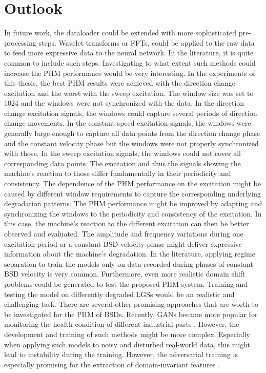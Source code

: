 \chapter{Outlook}
In future work, the dataloader could be extended with more sophisticated pre-processing steps. Wavelet transforms or FFTs, could be applied to the raw data to feed more expressive data to the neural network. In the literature, it is quite common to include such steps. Investigating to what extent such methods could increase the PHM performance would be very interesting.
In the experiments of this thesis, the best PHM results were achieved with the direction change excitation and the worst with the sweep excitation. The window size was set to 1024 and the windows were not synchronized with the data. In the direction change excitation signals, the windows could capture several periods of direction change movements. In the constant speed excitation signals, the windows were generally large enough to capture all data points from the direction change phase and the constant velocity phase but the windows were not properly synchronized with those. In the sweep excitation signals, the windows could not cover all corresponding data points. The excitation and thus the signals showing the machine's reaction to those differ fundamentally in their periodicity and consistency. The dependence of the PHM performance on the excitation might be caused by different window requirements to capture the corresponding underlying degradation patterns. The PHM performance might be improved by adapting and synchronizing the windows to the periodicity and consistency of the excitation. In this case, the machine's reaction to the different excitation can then be better observed and evaluated. The amplitude and frequency variations during one excitation period or a constant BSD velocity phase might deliver expressive information about the machine's degradation. In the literature, applying regime separation to train the models only on data recorded during phases of constant BSD velocity is very common.
Furthermore, even more realistic domain shift problems could be generated to test the proposed PHM system. Training and testing the model on differently degraded LGSs would be an realistic and challenging task.
There are several other promising approaches that are worth to be investigated for the PHM of BSDs. Recently, GANs became more popular for monitoring the health condition of different industrial parts \cite{Zhang2019}. However, the development and training of such methods might be more complex. Especially when applying such models to noisy and disturbed real-world data, this might lead to instability during the training. However, the adversarial training is especially promising for the extraction of domain-invariant features \cite{Zhang2019}. 





